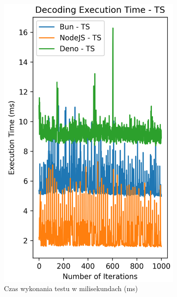 \begin{figure}[H]
  \centering
  \begin{subfigure}[b]{0.42\textwidth}
    \centering
    \includegraphics[width=\textwidth]{Figures/coding/base64_1000_decoding_ts_time.png}
    \caption{Czas wykonania testu w milisekundach (ms)}
    \label{fig:decoding_e2_ts_time}
  \end{subfigure}
  \begin{subfigure}[b]{0.42\textwidth}
    \centering

\end{subfigure}
\end{figure}
